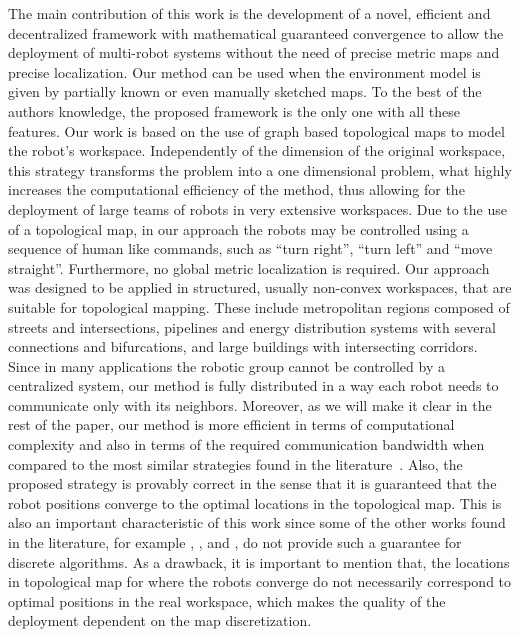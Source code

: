 \documentclass[smallcondensed]{svjour3}
\begin{document}
{\color{blue} The main contribution of this work is the development of a novel, efficient and decentralized framework with mathematical guaranteed convergence to allow the deployment of multi-robot systems without the need of precise metric maps and precise localization. Our method can be used when the environment model is given by partially known or even manually sketched maps. To the best of the authors knowledge, the proposed framework is the only one with all these features. Our work is based on the use of graph based topological maps to model the robot's workspace. Independently of the dimension of the original workspace, this strategy transforms the problem into a one dimensional problem, what highly increases the computational efficiency of the method, thus allowing for the deployment of large teams of robots in very extensive workspaces. Due to the use of a topological map, in our approach the robots may be controlled using a sequence of human like commands, such as ``turn right'', ``turn left'' and ``move straight''. Furthermore, no global metric localization is required. Our approach  was designed to be applied in structured, usually non-convex workspaces, that are suitable for topological mapping. These include metropolitan regions composed of streets and intersections, pi\-pe\-lines and energy distribution systems with several connections and bifurcations, and large buildings with intersecting corridors. Since in many applications the robotic group cannot be controlled by a centralized system, our method is fully distributed 
in a way each robot needs to communicate only with its neighbors. Moreover, as we will make it clear in the rest of the paper, our method is more efficient in terms of computational complexity and also in terms of the required communication bandwidth when compared to the most similar  strategies found in the literature~\cite{Durham2012,Yun2013}. Also, the proposed strategy is provably correct in the sense that it is guaranteed that the robot positions converge to the optimal locations in the topological map. This is also an important characteristic of this work since some of the other works found in the literature, for example \cite{Bhattacharya2013a}, \cite{Bhattacharya2013IJRR}, and \cite{reza2014}, do not provide such a guarantee for  discrete algorithms. As a drawback, it is important to mention that, the locations in topological map for where the robots converge do not necessarily correspond to optimal positions in the real workspace, which makes the quality of the deployment dependent on the map discretization.}
\end{document}
